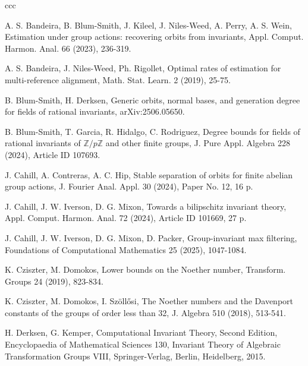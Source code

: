\documentclass[12pt, oneside]{amsart}
\begin{document}

\begin{thebibliography}{ccc}

A. S. Bandeira, B. Blum-Smith, J. Kileel, J. Niles-Weed, A. Perry, A. S. Wein, 
Estimation under group actions: recovering orbits from invariants, 
Appl. Comput. Harmon. Anal. 66 (2023), 236-319.

A. S. Bandeira, J. Niles-Weed, Ph. Rigollet, 
Optimal rates of estimation for multi-reference alignment, 
Math. Stat. Learn. 2 (2019), 25-75.  

 B. Blum-Smith, H. Derksen, 
Generic orbits, normal bases, and generation degree for fields of rational invariants, arXiv:2506.05650. 

B. Blum-Smith, T. Garcia, R. Hidalgo, C. Rodriguez, 
Degree bounds for fields of rational invariants of $\mathbb{Z}/p\mathbb{Z}$ and other finite groups, 
J. Pure Appl. Algebra 228 (2024), Article ID 107693. 

J. Cahill, A. Contreras, A. C. Hip, 
Stable separation of orbits for finite abelian group actions, 
J. Fourier Anal. Appl. 30 (2024), Paper No. 12, 16 p. 


J. Cahill, J. W. Iverson, D. G. Mixon, 
Towards a bilipschitz invariant theory, 
Appl. Comput. Harmon. Anal. 72 (2024), Article ID 101669, 27 p. 

 J. Cahill, J. W. Iverson, D. G. Mixon, D. Packer, 
Group-invariant max filtering, 
Foundations of Computational Mathematics 25 (2025), 1047-1084. 


K. Cziszter, M. Domokos, 
Lower bounds on the Noether number, 
Transform. Groups 24 (2019), 823-834. 


 K. Cziszter, M. Domokos, I. Sz\"oll\H osi, 
The Noether numbers and the Davenport constants of the groups of order less than 32, 
J. Algebra 510 (2018), 513-541. 


 H. Derksen, G. Kemper, Computational Invariant Theory, Second Edition, Encyclopaedia of Mathematical Sciences 130, Invariant Theory of Algebraic Transformation Groups VIII, Springer-Verlag, Berlin, Heidelberg, 2015. 


\end{thebibliography}
\end{document}
